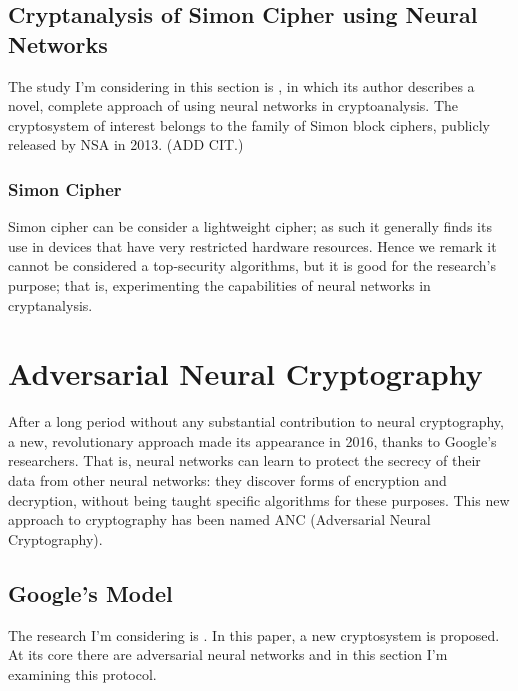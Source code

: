 \documentclass[%
    corpo=11pt,
    twoside,
    stile=classica,
    oldstyle,
    autoretitolo,
    tipotesi=magistrale,
    greek,
    evenboxes,
    english
]{toptesi}
\begin{document}
\section{Cryptanalysis of Simon Cipher using Neural Networks}
The study I'm considering in this section is \cite{jay}, in which its author describes a novel, complete approach of using neural networks in cryptoanalysis. The cryptosystem of interest belongs to the family of Simon block ciphers, publicly released by NSA in 2013. (ADD CIT.)  \\
\subsection{Simon Cipher}
Simon cipher can be consider a lightweight cipher; as such it generally finds its use in devices that have very restricted hardware resources. Hence we remark it cannot be considered a top-security algorithms, but it is good for the research's purpose; that is, experimenting the capabilities of neural networks in cryptanalysis. 







\chapter{Adversarial Neural Cryptography}
After a long period without any substantial contribution to neural cryptography, a new, revolutionary approach made its appearance in 2016, thanks to Google's researchers. That is, neural networks can learn to protect the secrecy of their data from other neural networks: they discover forms of encryption and decryption, without being taught specific algorithms for these purposes. This new approach to cryptography has been named ANC (Adversarial Neural Cryptography).

\section{Google's Model}
The research I'm considering is \cite{google}. In this paper, a new cryptosystem is proposed. At its core there are adversarial neural networks and in this section I'm examining this protocol.
\end{document}
